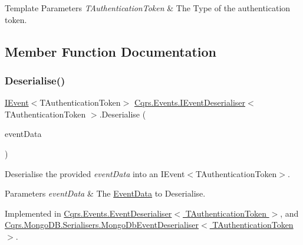 \begin{DoxyTemplParams}{Template Parameters}
{\em T\+Authentication\+Token} & The Type of the authentication token.\\
\hline
\end{DoxyTemplParams}


\subsection{Member Function Documentation}
\mbox{\label{interfaceCqrs_1_1Events_1_1IEventDeserialiser_af9216046631ed941bb96b58a0cc27f22_af9216046631ed941bb96b58a0cc27f22}} 
\subsubsection{\texorpdfstring{Deserialise()}{Deserialise()}}
{\footnotesize\ttfamily \hyperlink{interfaceCqrs_1_1Events_1_1IEvent}{I\+Event}$<$T\+Authentication\+Token$>$ \hyperlink{interfaceCqrs_1_1Events_1_1IEventDeserialiser}{Cqrs.\+Events.\+I\+Event\+Deserialiser}$<$ T\+Authentication\+Token $>$.Deserialise (\begin{DoxyParamCaption}\item[{\hyperlink{classCqrs_1_1Events_1_1EventData}{Event\+Data}}]{event\+Data }\end{DoxyParamCaption})}



Deserialise the provided {\itshape event\+Data}  into an I\+Event$<$\+T\+Authentication\+Token$>$. 


\begin{DoxyParams}{Parameters}
{\em event\+Data} & The \hyperlink{classCqrs_1_1Events_1_1EventData}{Event\+Data} to Deserialise.\\
\hline
\end{DoxyParams}


Implemented in \hyperlink{classCqrs_1_1Events_1_1EventDeserialiser_a193feac1d58446f0a7447d8ba04179fc_a193feac1d58446f0a7447d8ba04179fc}{Cqrs.\+Events.\+Event\+Deserialiser$<$ T\+Authentication\+Token $>$}, and \hyperlink{classCqrs_1_1MongoDB_1_1Serialisers_1_1MongoDbEventDeserialiser_a2ea63367d97bf66e3dffcabb8c53005e_a2ea63367d97bf66e3dffcabb8c53005e}{Cqrs.\+Mongo\+D\+B.\+Serialisers.\+Mongo\+Db\+Event\+Deserialiser$<$ T\+Authentication\+Token $>$}.

